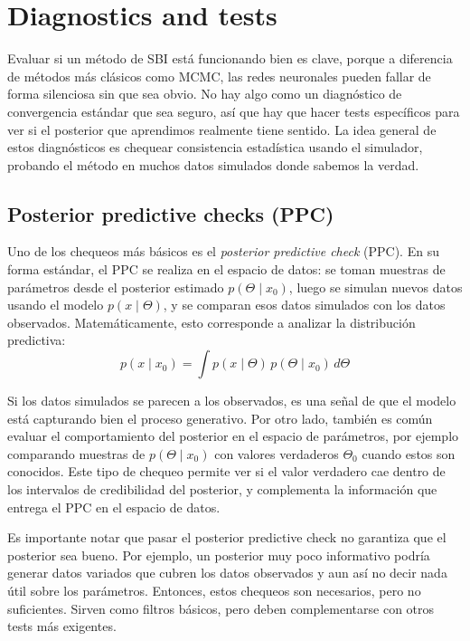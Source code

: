 \section{Diagnostics and tests}

Evaluar si un método de SBI está funcionando bien es clave, porque a diferencia de métodos más clásicos como MCMC, las redes neuronales pueden fallar de forma silenciosa sin que sea obvio. No hay algo como un diagnóstico de convergencia estándar que sea seguro, así que hay que hacer tests específicos para ver si el posterior que aprendimos realmente tiene sentido. La idea general de estos diagnósticos es chequear consistencia estadística usando el simulador, probando el método en muchos datos simulados donde sabemos la verdad.

\subsection{Posterior predictive checks (PPC)}

Uno de los chequeos más básicos es el \textit{posterior predictive check} (PPC). En su forma estándar, el PPC se realiza en el espacio de datos: se toman muestras de parámetros desde el posterior estimado $p(\Theta \mid x_0)$, luego se simulan nuevos datos usando el modelo $p(x \mid \Theta)$, y se comparan esos datos simulados con los datos observados. Matemáticamente, esto corresponde a analizar la distribución predictiva:
\begin{equation}
p(x \mid x_0) = \int p(x \mid \Theta)\, p(\Theta \mid x_0)\, d\Theta
\end{equation}

Si los datos simulados se parecen a los observados, es una señal de que el modelo está capturando bien el proceso generativo. Por otro lado, también es común evaluar el comportamiento del posterior en el espacio de parámetros, por ejemplo comparando muestras de $p(\Theta \mid x_0)$ con valores verdaderos $\Theta_0$ cuando estos son conocidos. Este tipo de chequeo permite ver si el valor verdadero cae dentro de los intervalos de credibilidad del posterior, y complementa la información que entrega el PPC en el espacio de datos.

Es importante notar que pasar el posterior predictive check no garantiza que el posterior sea bueno. Por ejemplo, un posterior muy poco informativo podría generar datos variados que cubren los datos observados y aun así no decir nada útil sobre los parámetros. Entonces, estos chequeos son necesarios, pero no suficientes. Sirven como filtros básicos, pero deben complementarse con otros tests más exigentes.

